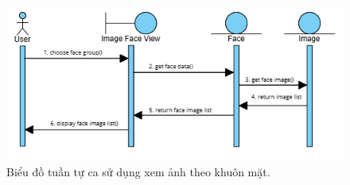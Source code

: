 \begin{figure}[H]
    \centering  
    \includegraphics[width=1\textwidth]{figures/c3/3-3-11-sequence-diagram.png}
    \caption{Biểu đồ tuần tự ca sử dụng xem ảnh theo khuôn mặt.}
    \label{fig:3-3-11-sequence-diagram}
\end{figure}